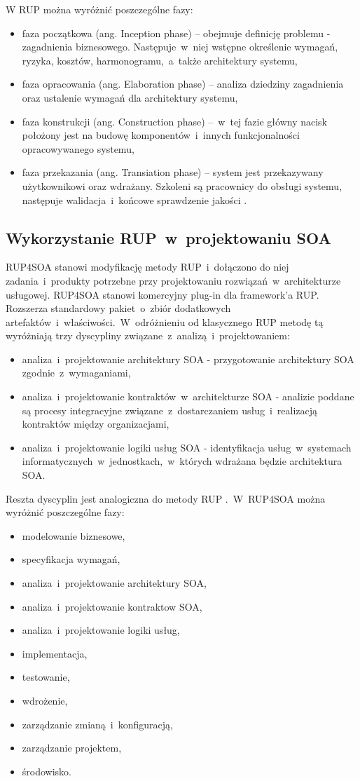 W RUP można wyróżnić poszczególne fazy:
\begin{itemize}
\item{faza początkowa (ang. Inception phase) – obejmuje definicję problemu - zagadnienia biznesowego. Następuje~w~niej wstępne określenie wymagań, ryzyka, kosztów, harmonogramu,~a~także architektury systemu,}
\item{faza opracowania (ang. Elaboration phase) – analiza dziedziny zagadnienia oraz ustalenie wymagań dla architektury systemu,}
\item{faza konstrukcji (ang. Construction phase) –~w~tej fazie główny nacisk położony jest na budowę komponentów~i~innych funkcjonalności opracowywanego systemu,}
\item{faza przekazania (ang. Transiation phase) – system jest przekazywany użytkownikowi oraz wdrażany. Szkoleni są pracownicy do obsługi systemu, następuje walidacja~i~końcowe sprawdzenie jakości \cite{RUPIntRat}. } 
\end{itemize}

\subsection{Wykorzystanie RUP~w~projektowaniu SOA}
RUP4SOA stanowi modyfikację metody RUP~i~dołączono do niej zadania~i~produkty potrzebne przy projektowaniu rozwiązań~w~architekturze usługowej. RUP4SOA stanowi komercyjny plug-in dla framework'a RUP. Rozszerza standardowy pakiet~o~zbiór dodatkowych artefaktów~i~właściwości.~W~odróżnieniu od klasycznego RUP metodę tą wyróżniają trzy dyscypliny związane~z~analizą~i~projektowaniem:
\begin{itemize}
\item{analiza~i~projektowanie architektury SOA - przygotowanie architektury SOA zgodnie~z~wymaganiami,}
\item{analiza~i~projektowanie kontraktów~w~architekturze SOA - analizie poddane są procesy integracyjne związane~z~dostarczaniem usług~i~realizacją kontraktów między organizacjami,}
\item{analiza~i~projektowanie logiki usług SOA - identyfikacja usług~w~systemach informatycznych~w~jednostkach,~w~których wdrażana będzie architektura SOA.}
\end{itemize}
Reszta dyscyplin jest analogiczna do metody RUP \cite{PlatIntGor}.~W~RUP4SOA można wyróżnić poszczególne fazy:
\begin{itemize}
\item {modelowanie biznesowe,}
\item {specyfikacja wymagań,}
\item {analiza~i~projektowanie architektury SOA,}
\item {analiza~i~projektowanie kontraktow SOA,}
\item {analiza~i~projektowanie logiki usług,}
\item {implementacja,}
\item {testowanie,}
\item {wdrożenie,}
\item {zarządzanie zmianą~i~konfiguracją,}
\item {zarządzanie projektem,}
\item {środowisko.}
\end{itemize}

